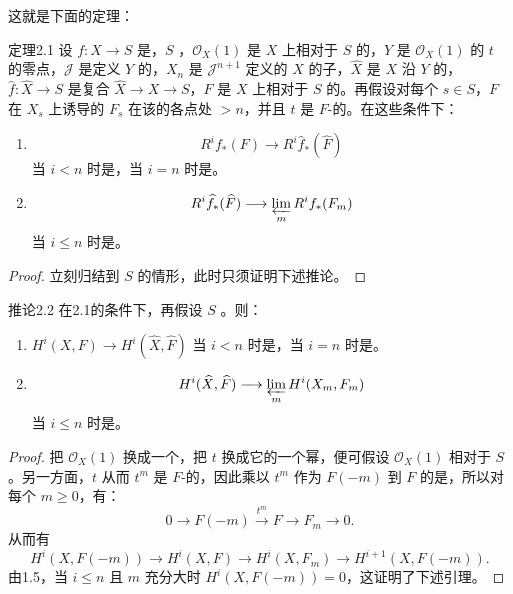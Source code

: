 这就是下面的定理：
\begin{SGAresult}{定理}{2.1}
设 $f:X\to S$ 是，$S$ ，$\mathcal O_X(1)$ 是 $X$ 上相对于 $S$ 的，$Y$ 是 $\mathcal O_X(1)$ 的 $t$ 的零点，$\mathcal J$ 是定义 $Y$ 的，$X_n$ 是 $\mathcal J^{n+1}$ 定义的 $X$ 的子，$\widehat X$ 是 $X$ 沿 $Y$ 的，$\widehat f:\widehat X\to S$ 是复合 $\widehat X\to X\to S$，$F$ 是 $X$ 上相对于 $S$ 的。再假设对每个 $s\in S$，$F$ 在 $X_s$ 上诱导的 $F_s$ 在该的各点处 $>n$，并且 $t$ 是 $F$-的。在这些条件下：
\begin{enumerate}
\item[(i)] 
\[
 R^if_*(F)\longrightarrow R^i\widehat f_*(\widehat F)
\]
当 $i<n$ 时是，当 $i=n$ 时是。
\item[(ii)] 
\[
 R^i\widehat f_*(\widehat F)\longrightarrow\varprojlim_m R^if_*(F_m)
\]
当 $i\leq n$ 时是。
\end{enumerate}
\end{SGAresult}
\begin{proof}
立刻归结到 $S$ 的情形，此时只须证明下述推论。
\end{proof}
\begin{SGAresult}{推论}{2.2}
在2.1的条件下，再假设 $S$ 。则：
\begin{enumerate}
\item[(i)]  $H^i(X,F)\to H^i(\widehat X,\widehat F)$ 当 $i<n$ 时是，当 $i=n$ 时是。
\item[(ii)] 
\[
 H^i(\widehat X,\widehat F)\longrightarrow\varprojlim_m H^i(X_m,F_m)
\]
当 $i\leq n$ 时是。
\end{enumerate}
\end{SGAresult}
\begin{proof}
把 $\mathcal O_X(1)$ 换成一个，把 $t$ 换成它的一个幂，便可假设 $\mathcal O_X(1)$ 相对于 $S$ 。另一方面，$t$ 从而 $t^m$ 是 $F$-的，因此乘以 $t^m$ 作为 $F(-m)$ 到 $F$ 的是，所以对每个 $m\geq0$，有：
\[
 0\longrightarrow F(-m)\xrightarrow{t^m}F\longrightarrow F_m\longrightarrow0.\tag{14}
\]
从而有
\[
 H^i(X,F(-m))\longrightarrow H^i(X,F)\longrightarrow H^i(X,F_m)\longrightarrow H^{i+1}(X,F(-m)).
\]
由1.5，当 $i\leq n$ 且 $m$ 充分大时 $H^i(X,F(-m))=0$，这证明了下述引理。
\end{proof}

